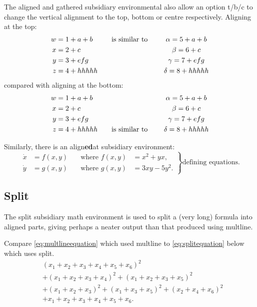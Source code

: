 \documentclass[a4paper,11pt]{article}
\begin{document}
The aligned and gathered subsidiary environmental also allow an option t/b/c to change the vertical alignment to the top, bottom or centre respectively. 
Aligning at the top:
\[
	\begin{aligned}[t]
		w &= 1 + a+b \\
		x &= 2 + c\\
		y &= 3 + efg \\
		z &= 4 + hhhhh
	\end{aligned}
\text{\qquad is similar to \qquad}
	\begin{gathered}[t]
		\alpha 	= 5 + a+b \\
		\beta 	= 6 + c\\
		\gamma 	= 7 + efg \\
		\delta 	= 8 + hhhhh
	\end{gathered} 
\]
compared with aligning at the bottom:
\[
	\begin{aligned}[b]
		w &= 1 + a+b \\
		x &= 2 + c\\
		y &= 3 + efg \\
		z &= 4 + hhhhh
	\end{aligned}
\text{\qquad is similar to \qquad}
	\begin{gathered}[b]
		\alpha 	= 5 + a+b \\
		\beta 	= 6 + c\\
		\gamma 	= 7 + efg \\
		\delta 	= 8 + hhhhh
	\end{gathered} 
\]

Similarly, there is an align\textbf{ed}at subsidiary environment:
\[
\left.
	\begin{alignedat}{4}
	\dot{x} & = f(x,y) & \quad \text{where } f(x,y) & = x^2+ yx,\\
	\dot{y} & = g(x,y) & \quad \text{where } g(x,y) & = 3xy- 5y^2.
	\end{alignedat}
\right\}
\text{defining equations.}
\]

\subsection{Split} 

The split subsidiary math environment is used to split a (very long) formula into aligned parts, giving perhaps a neater output than that produced using multline.

Compare \eqref{eq:multlineequation} which used multline to \eqref{eq:splitequation} below which uses split.
\begin{equation}\label{eq:splitequation}
\begin{split}
& (x_1 + x_2 + x_3 + x_4 + x_5 + x_6)^2 \\ 
& + (x_1 + x_2 + x_3 + x_4)^2 + ( x_1 + x_2 + x_3 + x_5)^2  \\
& + (x_1 + x_2 + x_3)^2 + ( x_1 + x_3 + x_5)^2 + (x_2  + x_4 +  x_6)^2 \\
& +  x_1 + x_2 + x_3 + x_4 + x_5 + x_6.
\end{split}
\end{equation}
\end{document}
